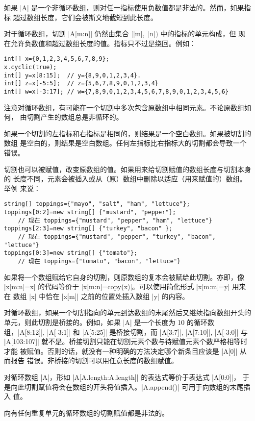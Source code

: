 \documentclass{ctexbook}
\begin{document}
{{{如果 |A| 是一个非循环数组，则对任一指标使用负数值都是非法的。然而，如果指标
超过数组长度，它们会被斯文地截短到此长度。

对于循环数组，切割 |A[m:n]| 仍然由集合 $[$|m|,~|n|$)$ 中的指标的单元构成，但
现在允许负数值和超过数组长度的值。指标只不过是绕回。例如：
\begin{lstlisting}
int[] x={0,1,2,3,4,5,6,7,8,9};
x.cyclic(true);
int[] y=x[8:15];  // y={8,9,0,1,2,3,4}.
int[] z=x[-5:5];  // z={5,6,7,8,9,0,1,2,3,4}
int[] w=x[-3:17]; // w={7,8,9,0,1,2,3,4,5,6,7,8,9,0,1,2,3,4,5,6}
\end{lstlisting}

注意对循环数组，有可能在一个切割中多次包含原数组中相同元素。不论原数组如何，
由切割产生的数组总是非循环的。

如果一个切割的左指标和右指标是相同的，则结果是一个空白数组。如果被切割的数组
是空白的，则结果是空白数组。任何左指标比右指标大的切割都会导致一个错误。

切割也可以被赋值，改变原数组的值。如果用来给切割赋值的数组长度与切割本身的
长度不同，元素会被插入或从（原）数组中删除以适应（用来赋值的）数组。举例
来说：
\begin{lstlisting}
string[] toppings={"mayo", "salt", "ham", "lettuce"};
toppings[0:2]=new string[] {"mustard", "pepper"};
    // 现在 toppings={"mustard", "pepper", "ham", "lettuce"}
toppings[2:3]=new string[] {"turkey", "bacon" };
    // 现在 toppings={"mustard", "pepper", "turkey", "bacon", "lettuce"}
toppings[0:3]=new string[] {"tomato"};
    // 现在 toppings={"tomato", "bacon", "lettuce"}
\end{lstlisting}

如果将一个数组赋给它自身的切割，则原数组的复本会被赋给此切割。亦即，像
|x[m:n]=x| 的代码等价于 |x[m:n]=copy(x)|。可以使用简化形式 |x[m:m]=y| 用来在
数组 |x| 中恰在 |x[m]| 之前的位置处插入数组 |y| 的内容。

对循环数组，如果一个切割指向的单元到达数组的末尾然后又继续指向数组开头的
单元，则此切割是桥接的。例如，如果 |A| 是一个长度为 10 的循环数组，|A[8:12]|,
|A[-3:1]| 和 |A[5:25]| 是桥接切割，而 |A[3:7]|, |A[7:10]|, |A[-3:0]| 与
|A[103:107]| 就不是。桥接切割只能在切割元素个数与待赋值元素个数严格相等时才能
被赋值。否则的话，就没有一种明确的方法决定哪个新条目应该是 |A[0]| 从而报告
错误。非桥接的切割可以用任意长度的数组赋值。

对循环数组 |A|，形如 |A[A.length:A.length]| 的表达式等价于表达式 |A[0:0]|，
于是向此切割赋值将会在数组的开头将值插入。|A.append()| 可用于向数组的末尾插入
值。

向有任何重复单元的循环数组的切割赋值都是非法的。



}}}
\end{document}

